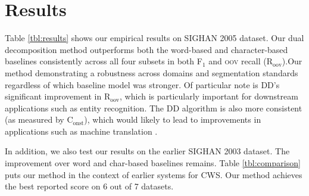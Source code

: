 \section{Results}

Table \ref{tbl:results} shows our empirical results on SIGHAN  2005 dataset. Our dual decomposition method outperforms both the word-based and character-based baselines  consistently across all four subsets in both F$_1$ and \textsc{oov} recall (R$_{\mathrm{oov}}$).Our method demonstrating a robustness across domains and segmentation standards regardless of which baseline model was stronger. Of particular note is DD's significant improvement in R$_{\mathrm{oov}}$, which is particularly important for downstream applications such as entity recognition. The DD algorithm is also more consistent (as measured by C$_{\mathrm{onst}}$), which would likely to lead to improvements in applications such as machine translation \cite{Chang:2008:ACL}. 

In addition, we also test our results on the earlier SIGHAN 2003 dataset. The improvement over word and char-based baselines remains. 
Table \ref{tbl:comparison} puts our method in the context of earlier systems for CWS. Our method achieves the best reported score on 6 out of 7 datasets.


